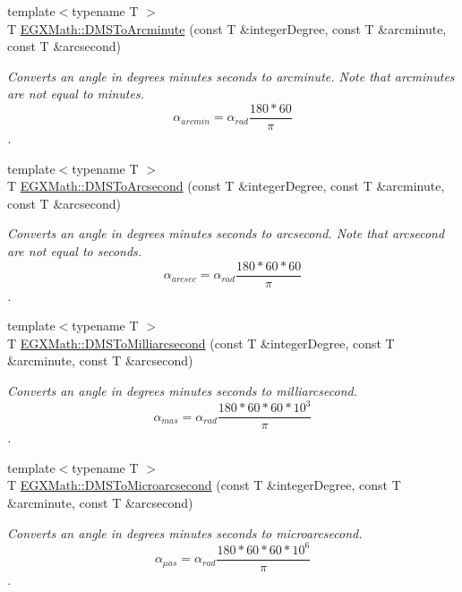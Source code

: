 \begin{DoxyCompactItemize}
{\footnotesize template$<$typename T $>$ }\\T \mbox{\hyperlink{group___e_g_x_math-_conversions-_angle_conversions-_d_m_s_gab0fa9a734b22ff812a83a7784280d6db}{E\+G\+X\+Math\+::\+D\+M\+S\+To\+Arcminute}} (const T \&integer\+Degree, const T \&arcminute, const T \&arcsecond)
\begin{DoxyCompactList}\small\item\em Converts an angle in degrees minutes seconds to arcminute. Note that arcminutes are not equal to minutes. \[\alpha_{arcmin}=\alpha_{rad}\frac{180 * 60}{\pi}\]. \end{DoxyCompactList}\item 
{\footnotesize template$<$typename T $>$ }\\T \mbox{\hyperlink{group___e_g_x_math-_conversions-_angle_conversions-_d_m_s_gac9d0871ac2dd889cf9f3c00d25f8a013}{E\+G\+X\+Math\+::\+D\+M\+S\+To\+Arcsecond}} (const T \&integer\+Degree, const T \&arcminute, const T \&arcsecond)
\begin{DoxyCompactList}\small\item\em Converts an angle in degrees minutes seconds to arcsecond. Note that arcsecond are not equal to seconds. \[\alpha_{arcsec}=\alpha_{rad}\frac{180 * 60 * 60}{\pi}\]. \end{DoxyCompactList}\item 
{\footnotesize template$<$typename T $>$ }\\T \mbox{\hyperlink{group___e_g_x_math-_conversions-_angle_conversions-_d_m_s_ga35a14699b2497a473f6a742ea2901557}{E\+G\+X\+Math\+::\+D\+M\+S\+To\+Milliarcsecond}} (const T \&integer\+Degree, const T \&arcminute, const T \&arcsecond)
\begin{DoxyCompactList}\small\item\em Converts an angle in degrees minutes seconds to milliarcsecond. \[\alpha_{mas}=\alpha_{rad}\frac{180 * 60 * 60 * 10^3}{\pi}\]. \end{DoxyCompactList}\item 
{\footnotesize template$<$typename T $>$ }\\T \mbox{\hyperlink{group___e_g_x_math-_conversions-_angle_conversions-_d_m_s_ga1230f4c81771a59d9973beb0e6747dbf}{E\+G\+X\+Math\+::\+D\+M\+S\+To\+Microarcsecond}} (const T \&integer\+Degree, const T \&arcminute, const T \&arcsecond)
\begin{DoxyCompactList}\small\item\em Converts an angle in degrees minutes seconds to microarcsecond. \[\alpha_{\mu as}=\alpha_{rad}\frac{180 * 60 * 60 * 10^6}{\pi}\]. \end{DoxyCompactList}\item 

\end{DoxyCompactItemize}
